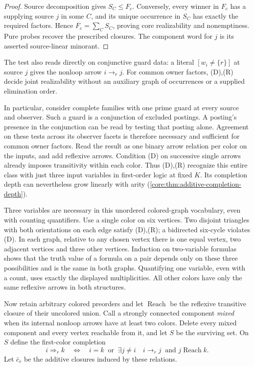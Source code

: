 \begin{proof}
Source decomposition gives $S_C\leq F_c$. Conversely, every winner
in $F_c$ has a supplying source $j$ in some $C$, and its unique
occurrence in $S_C$ has exactly the required factors. Hence
$F_c=\sum_C S_C$, proving core realizability and nonemptiness.
Pure probes recover the prescribed closures. The component word
for $j$ is its asserted source-linear minorant.
\end{proof}

The test also reads directly on conjunctive guard data: a literal
$[w_i\ne\{r\}]$ at source $j$ gives the nonloop arrow $i\to_r j$.
For common owner factors, (D),(R) decide joint realizability without
an auxiliary graph of occurrences or a supplied elimination order.

In particular, consider complete families with one prime guard at every
source and observer. Such a guard is a conjunction of excluded postings.
A posting's presence in the conjunction can be read by testing that
posting alone. Agreement on these tests across its observer facets is
therefore necessary and sufficient for common owner factors. Read the
result as one binary arrow relation per color on the inputs, and add
reflexive arrows. Condition (D) on successive single arrows already
imposes transitivity within each color. Thus (D),(R) recognize this
entire class with just three input variables in first-order logic at
fixed $K$. Its completion depth can nevertheless grow linearly with
arity (\cref{core:thm:additive-completion-depth}).

Three variables are necessary in this unordered colored-graph vocabulary,
even with counting quantifiers. Use a single color on six vertices.
Two disjoint triangles with both orientations on each edge satisfy
(D),(R); a bidirected six-cycle violates (D). In each graph, relative
to any chosen vertex there is one equal vertex, two adjacent vertices
and three other vertices. Induction on two-variable formulas shows that
the truth value of a formula on a pair depends only on these three
possibilities and is the same in both graphs. Quantifying one variable,
even with a count, uses exactly the displayed multiplicities. All other
colors have only the same reflexive arrows in both structures.

Now retain arbitrary colored preorders and let $\operatorname{Reach}$
be the reflexive transitive closure of their uncolored union. Call a
strongly connected component \emph{mixed} when its internal nonloop
arrows have at least two colors. Delete every mixed component and
every vertex reachable from it, and let $S$ be the surviving set.
On $S$ define the first-color completion
\begin{equation}\label{core:eq:additive-first-color}
 i\Rightarrow_r k\quad\Longleftrightarrow\quad
 i=k\ \text{ or }\
 \exists j\ne i\quad i\to_r j\ \text{ and }j\operatorname{Reach}k.
\end{equation}
Let $\bar c_r$ be the additive closures induced by these relations.

